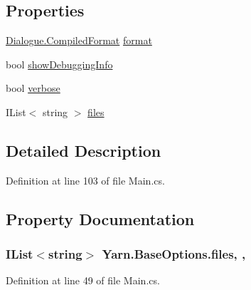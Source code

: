 \subsection*{Properties}
\begin{DoxyCompactItemize}
\item 
\hyperlink{a00088_a903f18cdcc66c28ceab5a43c41fe074d}{Dialogue.\-Compiled\-Format} \hyperlink{a00052_a9904ccfb1b0ff64df415c4fc9fe6eb1c}{format}
\item 
bool \hyperlink{a00040_a89964ea17bd19caf00cb5bff563ed01c}{show\-Debugging\-Info}
\item 
bool \hyperlink{a00040_ada4d83d1756918f362d55f6649b82b17}{verbose}
\item 
I\-List$<$ string $>$ \hyperlink{a00040_aa93cbb1bc1d5328e0a417012621e92d2}{files}
\end{DoxyCompactItemize}


\subsection{Detailed Description}


Definition at line 103 of file Main.\-cs.



\subsection{Property Documentation}
\hypertarget{a00040_aa93cbb1bc1d5328e0a417012621e92d2}{
\subsubsection[{files}]{\setlength{\rightskip}{0pt plus 5cm}I\-List$<$string$>$ Yarn.\-Base\-Options.\-files\hspace{0.3cm}{\ttfamily [get]}, {\ttfamily [set]}, {\ttfamily [inherited]}}}\label{a00040_aa93cbb1bc1d5328e0a417012621e92d2}


Definition at line 49 of file Main.\-cs.



